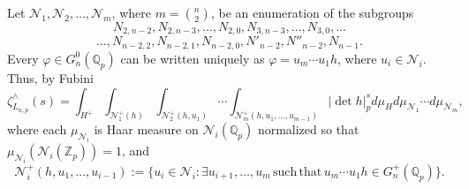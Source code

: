 \documentclass[12pt]{article}
\begin{document}
Let $\mathcal{N}_{1},\mathcal{N}_{2},\dots,\mathcal{N}_{m}$, where $m=\binom{n}{2}$, be an enumeration of the subgroups
\[N_{2,n-2},N_{2,n-3},\dots,N_{2,0},N_{3,n-3},\dots,N_{3,0},\dots\]\[\dots,N_{n-2,2},N_{n-2,1},N_{n-2,0},N'_{n-2},N''_{n-2},N_{n-1}.\]
Every $\varphi\in{G_{n}^{0}(\mathbb{Q}_{p})}$ can be written uniquely as $\varphi=u_{m}\cdots{u_{1}h}$, where $u_{i}\in{\mathcal{N}_{i}}$. Thus, by Fubini \[
\zeta_{L_{n,p}}^{\wedge}(s)=\displaystyle\int_{H^{+}}\displaystyle\int_{\mathcal{N}_{1}^{+}(h)}\displaystyle\int_{\mathcal{N}_{2}^{+}(h,u_{1})}\cdots\displaystyle\int_{\mathcal{N}_{m}^{+}(h,u_{1},\dots,u_{m-1})}|\det{h}|_{p}^{s}d\mu_{H}d\mu_{\mathcal{N}_{1}}\cdots{d\mu_{\mathcal{N}_{m}}},\]
where each $\mu_{\mathcal{N}_{i}}$ is Haar measure on $\mathcal{N}_{i}(\mathbb{Q}_{p})$ normalized so that\\ $\mu_{\mathcal{N}_{i}}(\mathcal{N}_{i}(\mathbb{Z}_{p}))=1$, and \[\mathcal{N}_{i}^{+}(h,u_{1},\dots,u_{i-1}):=\{u_{i}\in\mathcal{N}_{i} : \exists{u_{i+1},\dots,u_{m}}\,\mathrm{such}\,\mathrm{that}\,u_{m}\cdots{u_{1}}h\in{G_{n}^{+}(\mathbb{Q}_{p})}\}.\]
\end{document}

